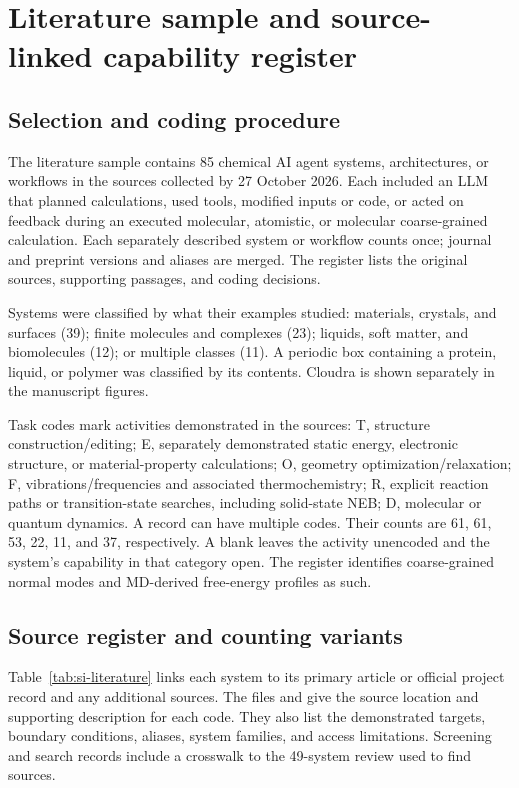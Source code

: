 \section{Literature sample and source-linked capability register}
\label{sec:si-literature}
\subsection{Selection and coding procedure}
The literature sample contains 85 chemical AI agent systems, architectures, or workflows in the sources collected by 27 October 2026. Each included an LLM that planned calculations, used tools, modified inputs or code, or acted on feedback during an executed molecular, atomistic, or molecular coarse-grained calculation. Each separately described system or workflow counts once; journal and preprint versions and aliases are merged. The register lists the original sources, supporting passages, and coding decisions.

Systems were classified by what their examples studied: materials, crystals, and surfaces (39); finite molecules and complexes (23); liquids, soft matter, and biomolecules (12); or multiple classes (11). A periodic box containing a protein, liquid, or polymer was classified by its contents. Cloudra is shown separately in the manuscript figures.

Task codes mark activities demonstrated in the sources: T, structure construction/editing; E, separately demonstrated static energy, electronic structure, or material-property calculations; O, geometry optimization/relaxation; F, vibrations/frequencies and associated thermochemistry; R, explicit reaction paths or transition-state searches, including solid-state NEB; D, molecular or quantum dynamics. A record can have multiple codes. Their counts are 61, 61, 53, 22, 11, and 37, respectively. A blank leaves the activity unencoded and the system's capability in that category open. The register identifies coarse-grained normal modes and MD-derived free-energy profiles as such.

\subsection{Source register and counting variants}
Table~\ref{tab:si-literature} links each system to its primary article or official project record and any additional sources. The files  and  give the source location and supporting description for each code. They also list the demonstrated targets, boundary conditions, aliases, system families, and access limitations. Screening and search records include a crosswalk to the 49-system review used to find sources.

